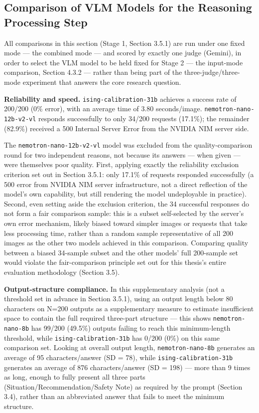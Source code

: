 \documentclass[12pt,a4paper]{report}
\begin{document}
\subsection{Comparison of VLM Models for the Reasoning Processing Step}

All comparisons in this section (Stage 1, Section 3.5.1) are run under one fixed mode --- the combined mode --- and scored by exactly one judge (Gemini), in order to select the VLM model to be held fixed for Stage 2 --- the input-mode comparison, Section 4.3.2 --- rather than being part of the three-judge/three-mode experiment that answers the core research question.

\textbf{Reliability and speed.} \texttt{ising-calibration-31b} achieves a success rate of 200/200 (0\% error), with an average time of 3.80 seconds/image. \texttt{nemotron-nano-12b-v2-vl} responds successfully to only 34/200 requests (17.1\%); the remainder (82.9\%) received a 500 Internal Server Error from the NVIDIA NIM server side.

The \texttt{nemotron-nano-12b-v2-vl} model was excluded from the quality-comparison round for two independent reasons, not because its answers --- when given --- were themselves poor quality. First, applying exactly the reliability exclusion criterion set out in Section 3.5.1: only 17.1\% of requests responded successfully (a 500 error from NVIDIA NIM server infrastructure, not a direct reflection of the model's own capability, but still rendering the model undeployable in practice). Second, even setting aside the exclusion criterion, the 34 successful responses do not form a fair comparison sample: this is a subset self-selected by the server's own error mechanism, likely biased toward simpler images or requests that take less processing time, rather than a random sample representative of all 200 images as the other two models achieved in this comparison. Comparing quality between a biased 34-sample subset and the other models' full 200-sample set would violate the fair-comparison principle set out for this thesis's entire evaluation methodology (Section 3.5).

\textbf{Output-structure compliance.} In this supplementary analysis (not a threshold set in advance in Section 3.5.1), using an output length below 80 characters on N=200 outputs as a supplementary measure to estimate insufficient space to contain the full required three-part structure --- this shows \texttt{nemotron-nano-8b} has 99/200 (49.5\%) outputs failing to reach this minimum-length threshold, while \texttt{ising-calibration-31b} has 0/200 (0\%) on this same comparison set. Looking at overall output length, \texttt{nemotron-nano-8b} generates an average of 95 characters/answer (SD = 78), while \texttt{ising-calibration-31b} generates an average of 876 characters/answer (SD = 198) --- more than 9 times as long, enough to fully present all three parts (Situation/Recommendation/Safety Note) as required by the prompt (Section 3.4), rather than an abbreviated answer that fails to meet the minimum structure.
\end{document}
